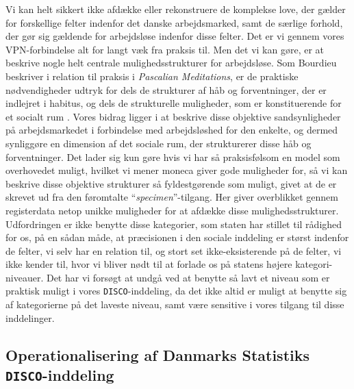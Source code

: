 Vi kan helt sikkert ikke afdække eller rekonstruere de komplekse love, der gælder for forskellige felter indenfor det danske arbejdsmarked, samt de særlige forhold, der gør sig gældende for arbejdsløse indenfor disse felter. Det er vi gennem vores VPN-forbindelse alt for langt væk fra praksis til. Men det vi kan gøre, er at beskrive nogle helt centrale mulighedsstrukturer for arbejdsløse. Som Bourdieu beskriver i relation til praksis i \emph{Pascalian Meditations}, er de praktiske nødvendigheder udtryk for dels de strukturer af håb og forventninger, der er indlejret i habitus, og dels de strukturelle muligheder, som er konstituerende for et socialt rum \parencite[211]{Bourdieu2000}. Vores bidrag ligger i at beskrive disse objektive sandsynligheder på arbejdsmarkedet i forbindelse med arbejdsløshed for den enkelte, og dermed synliggøre en dimension af det sociale rum, der strukturerer disse håb og forventninger. Det lader sig kun gøre hvis vi har så praksisfølsom en model som overhovedet muligt, hvilket vi mener moneca giver gode muligheder for, så vi kan beskrive disse objektive strukturer så fyldestgørende som muligt, givet at de er skrevet ud fra den føromtalte “\emph{specimen}”-tilgang. Her giver overblikket gennem registerdata netop unikke muligheder for at afdække disse mulighedsstrukturer. Udfordringen er ikke benytte disse kategorier, som staten har stillet til rådighed for os, på en sådan måde, at præcisionen i den sociale inddeling er størst indenfor de felter, vi selv har en relation til, og stort set ikke-eksisterende på de felter, vi ikke kender til, hvor vi bliver nødt til at forlade os på statens højere kategori-niveauer. Det har vi forsøgt at undgå ved at benytte så lavt et niveau som er praktisk muligt i vores \texttt{DISCO}-inddeling, da det ikke altid er muligt at benytte sig af kategorierne på det laveste niveau, samt være sensitive i vores tilgang til disse inddelinger.


\subsection{Operationalisering af Danmarks Statistiks \texttt{DISCO}-inddeling} \label{disco_dst}

